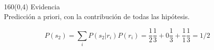 \documentclass[shownotes,aspectratio=169]{beamer}
\begin{document}
\begin{frame}[plain]
 
 
\end{frame}
% 
%  
% 

\begin{frame}[plain]
\begin{textblock}{160}(0,4)
 \centering \LARGE Evidencia \\
 \Large Predicción a priori, con la contribución de todas las hipótesis.
 \end{textblock}
 \vspace{1cm}
 
 \begin{equation*}
  P(s_2) = \sum_i P(s_2|r_i) P(r_i) = \frac{1}{2} \frac{1}{3} + 0 \frac{1}{3} + \frac{1}{1} \frac{1}{3} = 1/2 
 \end{equation*}


\end{frame}
\end{document}
